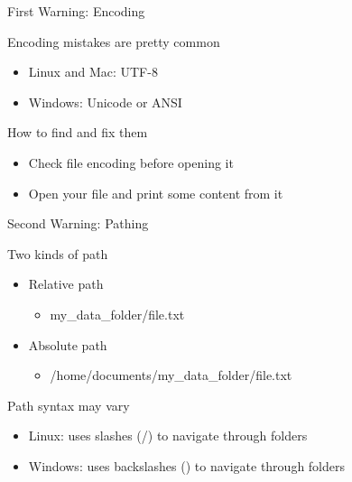 \documentclass[serif, aspectratio=169]{beamer}
\begin{document}
\begin{frame}{First Warning: Encoding}
    \begin{block}{Encoding mistakes are pretty common}
        \begin{itemize}
            \item Linux and Mac: UTF-8
            \item Windows: Unicode or ANSI
        \end{itemize}
    \end{block}
    \begin{block}{How to find and fix them}
        \begin{itemize}
            \item Check file encoding before opening it
            \item Open your file and print some content from it
        \end{itemize}
    \end{block}
\end{frame}

\begin{frame}{Second Warning: Pathing}
    \begin{block}{Two kinds of path}
        \begin{itemize}
            \item Relative path
            \begin{itemize}
                \item my\_data\_folder/file.txt
            \end{itemize}
            \item Absolute path
            \begin{itemize}
                \item /home/documents/my\_data\_folder/file.txt
            \end{itemize}
        \end{itemize}
    \end{block}
    \begin{block}{Path syntax may vary}
        \begin{itemize}
            \item Linux: uses slashes (/) to navigate through folders
            \item Windows: uses backslashes (\bs) to navigate through folders
        \end{itemize}
    \end{block}
\end{frame}
\end{document}
